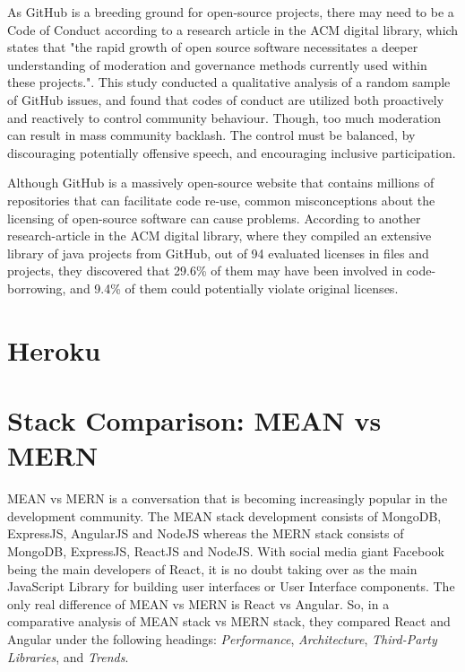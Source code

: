 As GitHub is a breeding ground for open-source projects, there may need to be a Code of Conduct according to a research article in the ACM digital library, which states that "the rapid growth of open source software necessitates a deeper understanding of moderation and governance methods currently used within these projects."\cite{code_of_conduct}. This study conducted a qualitative analysis of a random sample of GitHub issues, and found that codes of conduct are utilized both proactively and reactively to control community behaviour. Though, too much moderation can result in mass community backlash. The control must be balanced, by discouraging potentially offensive speech, and encouraging inclusive participation.

Although GitHub is a massively open-source website that contains millions of repositories that can facilitate code re-use, common misconceptions about the licensing of open-source software can cause problems. According to another research-article in the ACM digital library, where they compiled an extensive library of java projects from GitHub, out of 94 evaluated licenses in files and projects, they discovered that 29.6\% of them may have been involved in code-borrowing, and 9.4\% of them could potentially violate original licenses\cite{code_borrowing}.

\section{Heroku}

\section{Stack Comparison: MEAN vs MERN}
\label{Section:Stack Comparison: MEAN vs MERN}
MEAN vs MERN is a conversation that is becoming increasingly popular in the development community. The MEAN stack development consists of MongoDB, ExpressJS, AngularJS and NodeJS whereas the MERN stack consists of MongoDB, ExpressJS, ReactJS and NodeJS. With social media giant Facebook being the main developers of React, it is no doubt taking over as the main JavaScript Library for building user interfaces or User Interface components. The only real difference of MEAN vs MERN is React vs Angular. So, in a comparative analysis \cite{aggarwal2018comparative} of MEAN stack vs MERN stack, they compared React and Angular under the following headings: \textit{Performance}, \textit{Architecture}, \textit{Third-Party Libraries}, and \textit{Trends}. 


